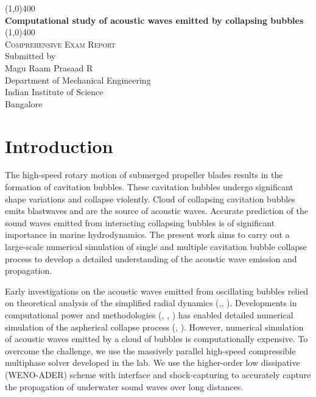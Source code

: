 \documentclass[12pt]{article}
\begin{document}
\begin{titlepage}
	\begin{center}
										
		\line(1,0){400}\\
		\huge{\bfseries Computational study of acoustic waves emitted by collapsing bubbles}\\
		\line(1,0){400}\\
		[3.5cm]
		\textsc{Comprehensive Exam Report}\\
		[4cm]
		Submitted by\\
		[.5cm]
		{Magu Raam Prasaad R}\\
		[2.cm]
		Department of Mechanical Engineering\\
		Indian Institute of Science\\
		Bangalore
								
	\end{center}
\end{titlepage}
\section*{Introduction}
The high-speed rotary motion of submerged propeller blades results in the formation of cavitation bubbles. These cavitation bubbles undergo significant shape variations and collapse violently. Cloud of collapsing cavitation bubbles emits blastwaves and are the source of acoustic waves. 
Accurate prediction of the sound waves emitted from interacting collapsing bubbles is of significant importance in marine hydrodynamics. 
The present work aims to carry out a large-scale numerical simulation of single and multiple cavitation bubble collapse process to develop a detailed understanding of the acoustic wave emission and propagation. 

Early investigations on the acoustic waves emitted from oscillating bubbles relied on theoretical analysis of the simplified radial dynamics (\cite{Rayleigh},\cite{Plesset}, \cite{Prosperetti}). Developments in computational power and methodologies (\cite{SHUKLA20107411}, \cite{SHUKLA2014508}, \cite{Pantano}) has enabled detailed numerical simulation of the aspherical collapse process (\cite{freund2009shock}, \cite{jamaluddin2011collapse}). However, 
numerical simulation of acoustic waves emitted by a cloud of bubbles is computationally expensive. To overcome the challenge, we use the massively parallel high-speed compressible multiphase solver developed in the lab. We use the higher-order low dissipative (WENO-ADER) scheme with interface and shock-capturing to accurately capture the propagation of underwater sound waves over long distances.
\end{document}
